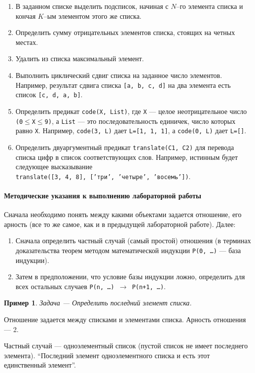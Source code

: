 \documentclass[12pt, openany, twoside]{book} %
\newtheorem{example}{Пример}[chapter]
\begin{document}
\begin{enumerate}
\item В заданном  списке выделить подсписок, начиная с $N$--го элемента списка и кончая $K$--ым элементом этого же списка.
\item Определить сумму отрицательных элементов списка, стоящих на четных местах.
\item Удалить из списка максимальный элемент.
\item Выполнить циклический сдвиг списка на заданное число элементов. Например, результат сдвига списка {\tt [a, b, c, d]} на два элемента есть список {\tt [c, d, a, b]}.
\item Определить предикат {\tt code(Х, List)}, где {\tt Х} --- целое неотрицательное число {\tt (0}$\leq${\tt X}$\leq${\tt 9)}, а {\tt List} --- это последовательность  единичек, число  которых  равно  {\tt Х}.  Например, {\tt code(3, L)} дает {\tt L=[1, 1, 1]}, а {\tt code(0, L)} дает {\tt L=[]}.
\item Определить двуаргументный предикат {\tt translate(С1, С2)} для перевода списка цифр в список соответствующих слов. Например, истинным будет следующее высказывание\\
     {\tt translate([3, 4, 8], ['три', 'четыре', 'восемь'])}.
\end{enumerate}

\paragraph{Методические указания к выполнению лабораторной работы}
  Сначала необходимо понять между какими объектами задается отношение, его арность (все то же самое, как и в предыдущей лабораторной работе). Далее:
  \begin{enumerate}
  \item Сначала определить частный случай (самый простой) отношения (в терминах доказательства теорем методом математической индукции {\tt P(0, \ldots)} --- база индукции).
  \item Затем в предположении, что условие базы индукции ложно, определить для всех остальных случаев {\tt P(n, \ldots) $\to$ P(n+1, \ldots)}.
  \end{enumerate}

\begin{example}
  Задача --- Определить последний элемент списка.
\end{example}
  Отношение задается между списками и элементами списка. Арность отношения --- 2.

Частный случай --- одноэлементный список (пустой список не имеет последнего элемента). ``Последний элемент одноэлементного списка и есть этот единственный элемент''.
\end{document}
